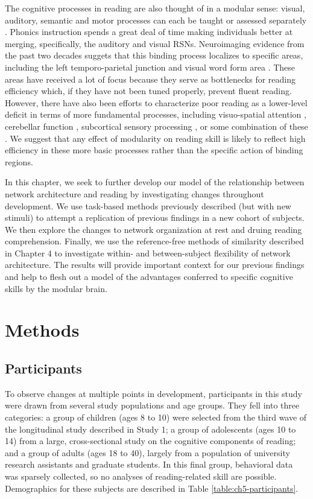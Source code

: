 The cognitive processes in reading are also thought of in a modular sense: visual, auditory, semantic and motor processes can each be taught or assessed separately \citep{Cutting2009a}. Phonics instruction spends a great deal of time making individuals better at merging, specifically, the auditory and visual RSNs. Neuroimaging evidence from the past two decades suggets that this binding process localizes to specific areas, including the left temporo-parietal junction and visual word form area \citep{Price2012}. These areas have received a lot of focus because they serve as bottlenecks for reading efficiency which, if they have not been tuned properly, prevent fluent reading. However, there have also been efforts to characterize poor reading as a lower-level deficit in terms of more fundamental processes, including visuo-spatial attention \citep{Vidyasagar2010}, cerebellar function \citep{Pernet2009, Eckert2003},  subcortical sensory processing \citep{Stein1997, Fan2014}, or some combination of these \citep{Pernet2009}. We suggest that any effect of modularity on reading skill is likely to reflect high efficiency in these more basic processes rather than the specific action of binding regions. 

In this chapter, we seek to further develop our model of the relationship between network architecture and reading by investigating changes throughout development. We use task-based methods previously described (but with new stimuli) to attempt a replication of previous findings in a new cohort of subjects.  We then explore the changes to network organization at rest and druing reading comprehension. Finally, we use the reference-free methods of similarity described in Chapter 4 to investigate within- and between-subject flexibility of network architecture. The results will provide important context for our previous findings and help to flesh out a model of the advantages conferred to specific cognitive skills by the modular brain.


\section{Methods}

\subsection{Participants}

To observe changes at multiple points in development, participants in this study were drawn from several study populations and age groups. They fell into three categories: a group of children (ages 8 to 10) were selected from the third wave of the longitudinal study described in Study 1;  a group of adolescents (ages 10 to 14) from a large, cross-sectional study on the cognitive components of reading; and a group of adults (ages 18 to 40), largely from a population of university research assistants and graduate students. In this final group, behavioral data was sparsely collected, so no analyses of reading-related skill are possible. Demographics for these subjects are described in Table \ref{table:ch5-participants}.

